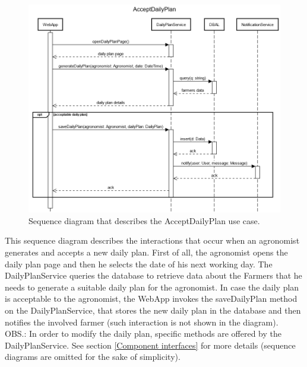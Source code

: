\documentclass{article}
\begin{document}
\newpage
\begin{figure}[H]
   \centering
   \includegraphics[scale=0.40]{diagrams/sequence diagrams/AcceptDailyPlan.png}
    \caption{Sequence diagram that describes the AcceptDailyPlan use case.}
\end{figure}
This sequence diagram describes the interactions that occur when an agronomist generates and accepts a new daily plan. First of all, the agronomist opens the daily plan page and then he selects the date of his next working day. The DailyPlanService queries the database to retrieve data about the Farmers that he needs to generate a suitable daily plan for the agronomist. In case the daily plan is acceptable to the agronomist, the WebApp invokes the saveDailyPlan method on the DailyPlanService, that stores the new daily plan in the database and then notifies the involved farmer (such interaction is not shown in the diagram).\\
OBS.: In order to modify the daily plan, specific methods are offered by the DailyPlanService. See section \ref{Component interfaces} for more details (sequence diagrams are omitted for the sake of simplicity).
\end{document}

